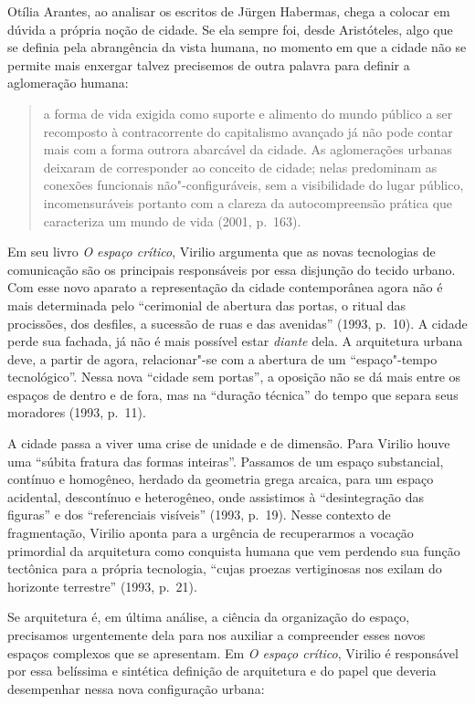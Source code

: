 Otília Arantes, ao analisar os escritos de Jürgen
Habermas, chega a colocar em dúvida a própria noção de cidade. Se ela
sempre foi, desde Aristóteles, algo que se definia pela abrangência da
vista humana, no momento em que a cidade não se permite mais enxergar
talvez precisemos de outra palavra para definir a aglomeração humana:

\begin{quote}
a forma de vida exigida como suporte e alimento do mundo público a ser
recomposto à contracorrente do capitalismo avançado já não pode contar
mais com a forma outrora abarcável da cidade. As aglomerações urbanas
deixaram de corresponder ao conceito de cidade; nelas predominam as
conexões funcionais não"-configuráveis, sem a visibilidade do lugar
público, incomensuráveis portanto com a clareza da autocompreensão
prática que caracteriza um mundo de vida (2001, p.~163).
\end{quote}

Em seu livro \emph{O espaço crítico}, Virilio argumenta que as novas
tecnologias de comunicação são os principais responsáveis por essa
disjunção do tecido urbano. Com esse novo aparato a representação da
cidade contemporânea agora não é mais determinada pelo ``cerimonial de
abertura das portas, o ritual das procissões, dos desfiles, a sucessão
de ruas e das avenidas'' (1993, p.~10). A cidade perde sua fachada, já
não é mais possível estar \emph{diante} dela. A arquitetura urbana deve,
a partir de agora, relacionar"-se com a abertura de um ``espaço"-tempo
tecnológico''. Nessa nova ``cidade sem portas'', a oposição não se dá
mais entre os espaços de dentro e de fora, mas na ``duração técnica'' do
tempo que separa seus moradores (1993, p.~11).

A cidade passa a viver uma crise de unidade e de dimensão. Para Virilio
houve uma ``súbita fratura das formas inteiras''. Passamos de um espaço
substancial, contínuo e homogêneo, herdado da geometria grega arcaica,
para um espaço acidental, descontínuo e heterogêneo, onde assistimos à
``desintegração das figuras'' e dos ``referenciais visíveis'' (1993, p.~19). Nesse contexto de fragmentação, Virilio aponta para a urgência de
recuperarmos a vocação primordial da arquitetura como conquista humana
que vem perdendo sua função tectônica para a própria tecnologia, ``cujas
proezas vertiginosas nos exilam do horizonte terrestre'' (1993, p.~21).

Se arquitetura é, em última análise, a ciência da organização do espaço,
precisamos urgentemente dela para nos auxiliar a compreender esses novos
espaços complexos que se apresentam. Em \emph{O espaço crítico}, Virilio
é responsável por essa belíssima e sintética definição de arquitetura e
do papel que deveria desempenhar nessa nova configuração urbana:

